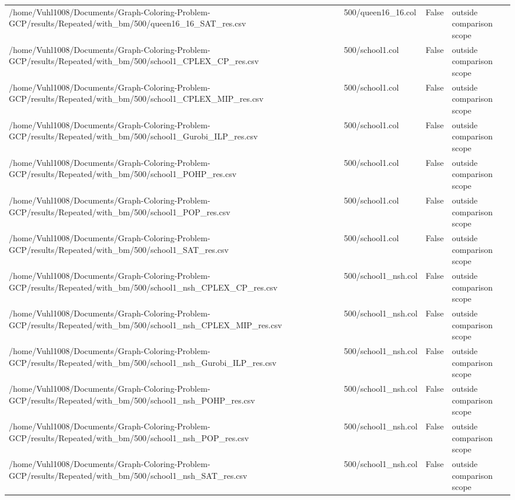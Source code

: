 \begin{table}[htbp]
\begin{tabular}{llll}
/home/Vuhl1008/Documents/Graph-Coloring-Problem-GCP/results/Repeated/with\_bm/500/queen16\_16\_SAT\_res.csv & 500/queen16\_16.col & False & outside comparison scope \\
/home/Vuhl1008/Documents/Graph-Coloring-Problem-GCP/results/Repeated/with\_bm/500/school1\_CPLEX\_CP\_res.csv & 500/school1.col & False & outside comparison scope \\
/home/Vuhl1008/Documents/Graph-Coloring-Problem-GCP/results/Repeated/with\_bm/500/school1\_CPLEX\_MIP\_res.csv & 500/school1.col & False & outside comparison scope \\
/home/Vuhl1008/Documents/Graph-Coloring-Problem-GCP/results/Repeated/with\_bm/500/school1\_Gurobi\_ILP\_res.csv & 500/school1.col & False & outside comparison scope \\
/home/Vuhl1008/Documents/Graph-Coloring-Problem-GCP/results/Repeated/with\_bm/500/school1\_POHP\_res.csv & 500/school1.col & False & outside comparison scope \\
/home/Vuhl1008/Documents/Graph-Coloring-Problem-GCP/results/Repeated/with\_bm/500/school1\_POP\_res.csv & 500/school1.col & False & outside comparison scope \\
/home/Vuhl1008/Documents/Graph-Coloring-Problem-GCP/results/Repeated/with\_bm/500/school1\_SAT\_res.csv & 500/school1.col & False & outside comparison scope \\
/home/Vuhl1008/Documents/Graph-Coloring-Problem-GCP/results/Repeated/with\_bm/500/school1\_nsh\_CPLEX\_CP\_res.csv & 500/school1\_nsh.col & False & outside comparison scope \\
/home/Vuhl1008/Documents/Graph-Coloring-Problem-GCP/results/Repeated/with\_bm/500/school1\_nsh\_CPLEX\_MIP\_res.csv & 500/school1\_nsh.col & False & outside comparison scope \\
/home/Vuhl1008/Documents/Graph-Coloring-Problem-GCP/results/Repeated/with\_bm/500/school1\_nsh\_Gurobi\_ILP\_res.csv & 500/school1\_nsh.col & False & outside comparison scope \\
/home/Vuhl1008/Documents/Graph-Coloring-Problem-GCP/results/Repeated/with\_bm/500/school1\_nsh\_POHP\_res.csv & 500/school1\_nsh.col & False & outside comparison scope \\
/home/Vuhl1008/Documents/Graph-Coloring-Problem-GCP/results/Repeated/with\_bm/500/school1\_nsh\_POP\_res.csv & 500/school1\_nsh.col & False & outside comparison scope \\
/home/Vuhl1008/Documents/Graph-Coloring-Problem-GCP/results/Repeated/with\_bm/500/school1\_nsh\_SAT\_res.csv & 500/school1\_nsh.col & False & outside comparison scope \\

\end{tabular}
\end{table}
